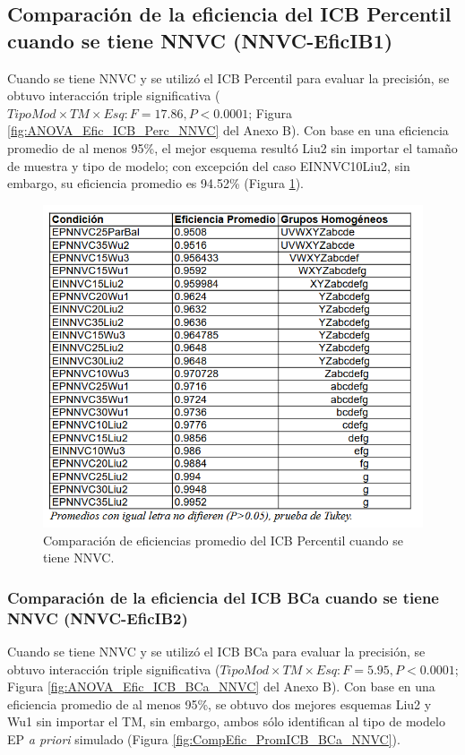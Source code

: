 
\subsection{Comparación de la eficiencia del ICB Percentil cuando se tiene NNVC (NNVC-EficIB1)}

Cuando se tiene NNVC y se utilizó el ICB Percentil para evaluar la precisión, se obtuvo interacción triple significativa ($TipoMod \times TM \times Esq: F=17.86, P<0.0001$; Figura \ref{fig:ANOVA_Efic_ICB_Perc_NNVC} del Anexo B). Con base en una eficiencia promedio de al menos 95\%, el mejor esquema resultó Liu2 sin importar el tamaño de muestra y tipo de modelo; con excepción del caso EINNVC10Liu2, sin embargo, su eficiencia promedio es 94.52\% (Figura \ref{fig:CompEfic_PromICB_Perc_NNVC}).\\

\begin{figure}[ht] 
	\centering 
	\includegraphics[width=0.76\linewidth]{img/CompEfic_PromICB_Perc_NNVC.png} 
	\caption{Comparación de eficiencias promedio del ICB Percentil cuando se tiene NNVC.} 
	\label{fig:CompEfic_PromICB_Perc_NNVC}
\end{figure}
\FloatBarrier



\subsubsection{Comparación de la eficiencia del ICB BCa cuando se tiene NNVC (NNVC-EficIB2)}

Cuando se tiene NNVC y se utilizó el ICB BCa para evaluar la precisión, se obtuvo interacción triple significativa ($TipoMod \times TM \times Esq: F=5.95, P<0.0001$; Figura \ref{fig:ANOVA_Efic_ICB_BCa_NNVC} del Anexo B). Con base en una eficiencia promedio de al menos 95\%, se obtuvo dos mejores esquemas Liu2 y Wu1 sin importar el TM, sin embargo, ambos sólo identifican al tipo de modelo EP \textit{a priori} simulado (Figura \ref{fig:CompEfic_PromICB_BCa_NNVC}). \\


